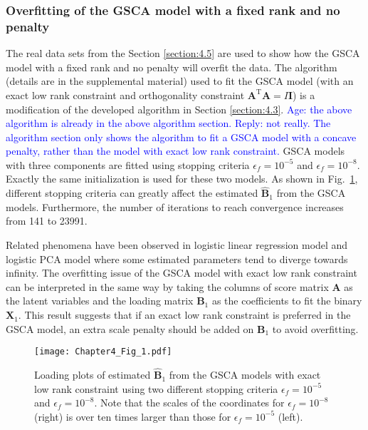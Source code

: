\subsubsection{Overfitting of the GSCA model with a fixed rank and no penalty}
The real data sets from the Section \ref{section:4.5} are used to show how the GSCA model with a fixed rank and no penalty will overfit the data. The algorithm (details are in the supplemental material) used to fit the GSCA model (with an exact low rank constraint and orthogonality constraint $\mathbf{A}^{\text{T}}\mathbf{A} = I\mathbf{I}$) is a modification of the developed algorithm in Section \ref{section:4.3}. \textcolor{blue}{Age: the above algorithm is already in the above algorithm section. Reply: not really. The algorithm section only shows the algorithm to fit a GSCA model with a concave penalty, rather than the model with exact low rank constraint.} GSCA models with three components are fitted using stopping criteria $\epsilon_f = 10^{-5}$ and $\epsilon_f=10^{-8}$. Exactly the same initialization is used for these two models. As shown in Fig.~\ref{chapter4_fig:1}, different stopping criteria can greatly affect the estimated $\hat{\mathbf{B}}_1$ from the GSCA models. Furthermore, the number of iterations to reach convergence increases from 141 to 23991.

Related phenomena have been observed in logistic linear regression model and logistic PCA model \cite{de2006principal, song2017principal} where some estimated parameters tend to diverge towards infinity. The overfitting issue of the GSCA model with exact low rank constraint can be interpreted in the same way by taking the columns of score matrix $\mathbf{A}$ as the latent variables and the loading matrix $\mathbf{B}_1$ as the coefficients to fit the binary $\mathbf{X}_1$. This result suggests that if an exact low rank constraint is preferred in the GSCA model, an extra scale penalty should be added on $\mathbf{B}_1$ to avoid overfitting.
\begin{figure}[htbp]
    \centering
    \texttt{[image: Chapter4\_Fig\_1.pdf]}
    \caption{Loading plots of estimated $\hat{\mathbf{B}}_1$ from the GSCA models with exact low rank constraint using two different stopping criteria $\epsilon_f =10^{-5}$ and $\epsilon_f=10^{-8}$. Note that the scales of the coordinates for $\epsilon_f = 10^{-8}$ (right) is over ten times larger than those for $\epsilon_f = 10^{-5}$ (left).}
    \label{chapter4_fig:1}
\end{figure}


